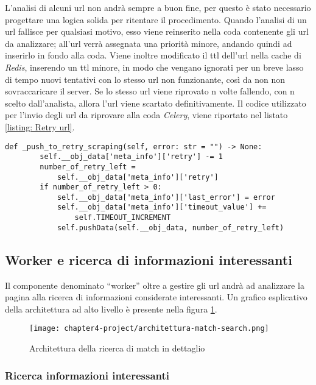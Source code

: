 L’analisi di alcuni url non andrà sempre a buon fine, per questo è stato necessario progettare una logica solida per ritentare il procedimento. Quando l’analisi di un url fallisce per qualsiasi motivo, esso viene reinserito nella coda contenente gli url da analizzare; all’url verrà assegnata una priorità minore, andando quindi ad inserirlo in fondo alla coda. Viene inoltre modificato il \gls{ttl} dell’url nella cache di \emph{Redis}, inserendo un \gls{ttl} minore, in modo che vengano ignorati per un breve lasso di tempo nuovi tentativi con lo stesso url non funzionante, così da non non sovraccaricare il server. Se lo stesso url viene riprovato n volte fallendo, con n scelto dall’analista, allora l’url viene scartato definitivamente. Il codice utilizzato per l'invio degli url da riprovare alla coda \emph{Celery}, viene riportato nel listato \ref{listing: Retry url}.

\begin{lstlisting}[caption=Invio degli url da riprovare alla coda.,
	label=listing: Retry url]
    def _push_to_retry_scraping(self, error: str = "") -> None:
        self.__obj_data['meta_info']['retry'] -= 1
        number_of_retry_left = 
            self.__obj_data['meta_info']['retry']
        if number_of_retry_left > 0:
            self.__obj_data['meta_info']['last_error'] = error
            self.__obj_data['meta_info']['timeout_value'] += 
                self.TIMEOUT_INCREMENT
            self.pushData(self.__obj_data, number_of_retry_left)
\end{lstlisting}


\subsection{Worker e ricerca di informazioni interessanti}

Il componente denominato ``worker'' oltre a gestire gli url andrà ad analizzare la pagina alla ricerca di informazioni considerate interessanti. Un grafico esplicativo della architettura ad alto livello è presente nella figura \ref{fig:architettura ricerca match}.
\begin{figure}[!h] 
    \centering 
    \texttt{[image: chapter4-project/architettura-match-search.png]} 
    \caption{Architettura della ricerca di match in dettaglio}
    \label{fig:architettura ricerca match}
\end{figure}

\subsubsection{Ricerca informazioni interessanti}

